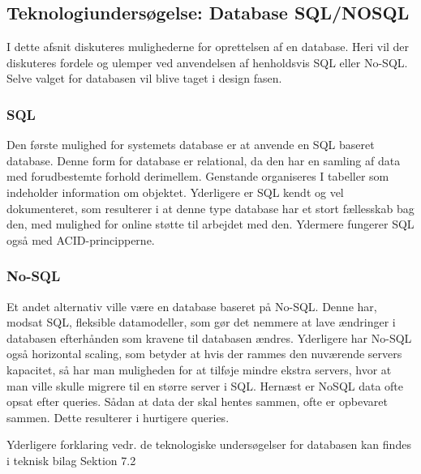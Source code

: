 \subsection{Teknologiundersøgelse: Database SQL/NOSQL
}
I dette afsnit diskuteres mulighederne for oprettelsen af en database. Heri vil der diskuteres fordele og ulemper ved anvendelsen af henholdsvis SQL eller No-SQL. Selve valget for databasen vil blive taget i design fasen.


\subsubsection{SQL}
Den første mulighed for systemets database er at anvende en SQL baseret database. Denne form for database
er relational, da den har en samling af data med forudbestemte forhold derimellem. Genstande
organiseres I tabeller som indeholder information om objektet. Yderligere er SQL kendt og vel
dokumenteret, som resulterer i at denne type database har et stort fællesskab bag den, med mulighed for online støtte til arbejdet med den. Ydermere fungerer SQL også med ACID-principperne.
\cite{Yalantis} \cite{IBM} 
\subsubsection{No-SQL}
Et andet alternativ ville være en database baseret på No-SQL. Denne har, modsat SQL, fleksible
datamodeller, som gør det nemmere at lave ændringer i databasen efterhånden som kravene til
databasen ændres. Yderligere har No-SQL også horizontal scaling, som betyder at hvis der rammes
den nuværende servers kapacitet, så har man muligheden for at tilføje mindre ekstra servers, hvor at man ville skulle migrere til en større server i SQL. Hernæst er NoSQL data ofte opsat efter queries. Sådan at data der skal hentes sammen,
ofte er opbevaret sammen. Dette resulterer i hurtigere queries.\\
\cite{MongoDB.com}

\noindent Yderligere forklaring vedr. de teknologiske undersøgelser for databasen kan findes i teknisk bilag Sektion 7.2
